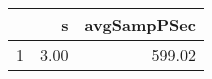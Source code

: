 \begin{table}[h]
\centering
\begin{tabular}{rrr}
  \hline
 & s & avgSampPSec \\ 
  \hline
1 & 3.00 & 599.02 \\ 
   \hline
\end{tabular}
\end{table}
